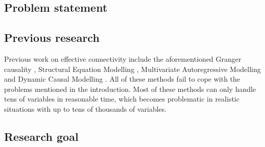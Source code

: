 \documentclass[a4paper, 10pt, english, onecolumn]{article}
\begin{document}
\subsection{Problem statement}

\subsection{Previous research}
Previous work on effective connectivity include the aforementioned Granger causality \cite{roebroeck2005}, Structural Equation Modelling \cite{mclntosh1994}, Multivariate Autoregressive Modelling \cite{harrison2003} and Dynamic Causal Modelling \cite{friston2003}.
All of these methods fail to cope with the problems mentioned in the introduction.
Most of these methods can only handle tens of variables in reasonable time, which becomes problematic in realistic situations with up to tens of thousands of variables.

\subsection{Research goal}
%
\end{document}
